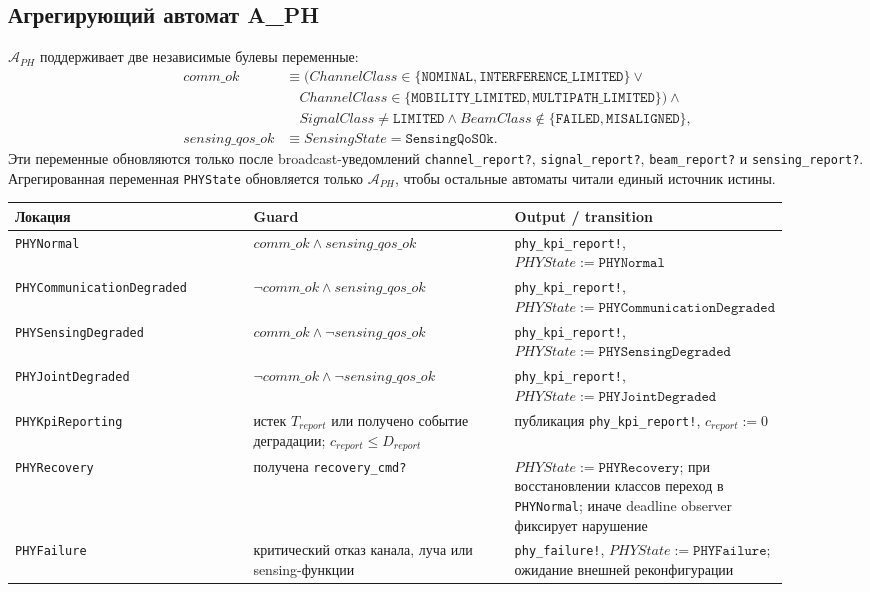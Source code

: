 \documentclass[10pt,a4paper]{article}
\newcommand{\code}[1]{\texttt{#1}}
\newcommand{\A}[1]{\mathcal{A}_{#1}}
\begin{document}
\subsection{Агрегирующий автомат A\_PH}

\(\A{PH}\) поддерживает две независимые булевы переменные:
\begin{align}
comm\_ok &\equiv (ChannelClass\in\{\code{NOMINAL},\code{INTERFERENCE\_LIMITED}\}\vee{}\\
&\quad ChannelClass\in\{\code{MOBILITY\_LIMITED},\code{MULTIPATH\_LIMITED}\})\wedge{}\\
&\quad SignalClass\ne\code{LIMITED}\wedge BeamClass\notin\{\code{FAILED},\code{MISALIGNED}\},\\
sensing\_qos\_ok &\equiv SensingState=\code{SensingQoSOk}.
\end{align}
Эти переменные обновляются только после broadcast-уведомлений \code{channel\_report?}, \code{signal\_report?}, \code{beam\_report?} и \code{sensing\_report?}. Агрегированная переменная \code{PHYState} обновляется только \(\A{PH}\), чтобы остальные автоматы читали единый источник истины.

\begin{longtable}{|p{0.31\linewidth}|p{0.34\linewidth}|p{0.25\linewidth}|}
\hline
Локация & Guard & Output / transition \\
\hline
\code{PHYNormal} & \(comm\_ok\wedge sensing\_qos\_ok\) & \code{phy\_kpi\_report!}, \(PHYState:=\code{PHYNormal}\) \\
\hline
\code{PHYCommunicationDegraded} & \(\neg comm\_ok\wedge sensing\_qos\_ok\) & \code{phy\_kpi\_report!}, \(PHYState:=\code{PHYCommunicationDegraded}\) \\
\hline
\code{PHYSensingDegraded} & \(comm\_ok\wedge\neg sensing\_qos\_ok\) & \code{phy\_kpi\_report!}, \(PHYState:=\code{PHYSensingDegraded}\) \\
\hline
\code{PHYJointDegraded} & \(\neg comm\_ok\wedge\neg sensing\_qos\_ok\) & \code{phy\_kpi\_report!}, \(PHYState:=\code{PHYJointDegraded}\) \\
\hline
\code{PHYKpiReporting} & истек \(T_{report}\) или получено событие деградации; \(c_{report}\le D_{report}\) & публикация \code{phy\_kpi\_report!}, \(c_{report}:=0\) \\
\hline
\code{PHYRecovery} & получена \code{recovery\_cmd?} & \(PHYState:=\code{PHYRecovery}\); при восстановлении классов переход в \code{PHYNormal}; иначе deadline observer фиксирует нарушение \\
\hline
\code{PHYFailure} & критический отказ канала, луча или sensing-функции & \code{phy\_failure!}, \(PHYState:=\code{PHYFailure}\); ожидание внешней реконфигурации \\
\hline
\end{longtable}
\end{document}
